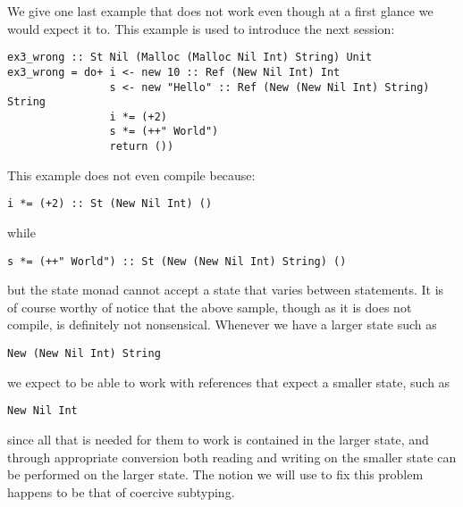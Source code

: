 We give one last example that does not work even though at a first glance we would expect it to. This example is used to introduce the next session:
\begin{lstlisting}
ex3_wrong :: St Nil (Malloc (Malloc Nil Int) String) Unit
ex3_wrong = do+ i <- new 10 :: Ref (New Nil Int) Int
                s <- new "Hello" :: Ref (New (New Nil Int) String) String
                i *= (+2)
                s *= (++" World")
                return ())
\end{lstlisting}

This example does not even compile because:
\begin{lstlisting}
i *= (+2) :: St (New Nil Int) ()
\end{lstlisting}

while
\begin{lstlisting}
s *= (++" World") :: St (New (New Nil Int) String) ()
\end{lstlisting}

but the state monad cannot accept a state that varies between statements. It is of course worthy of notice that the above sample, though as it is does not compile, is definitely not nonsensical. Whenever we have a larger state such as 
\begin{lstlisting}
New (New Nil Int) String
\end{lstlisting}

we expect to be able to work with references that expect a smaller state, such as
\begin{lstlisting}
New Nil Int
\end{lstlisting}

since all that is needed for them to work is contained in the larger state, and through appropriate conversion both reading and writing on the smaller state can be performed on the larger state. The notion we will use to fix this problem happens to be that of coercive subtyping.
